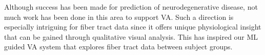 



Although success has been made for prediction of  neurodegenerative disease, not much work has been done in this area to support VA. Such a direction is especially intriguing for fiber tract data since it offers unique physiological insight that can be gained through qualitative visual analysis.%
This has inspired our ML guided VA system that explores fiber tract data between subject groups. 




